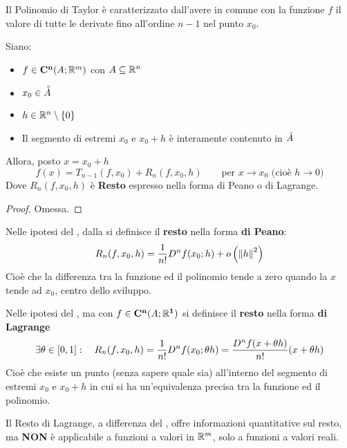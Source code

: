 \begin{observation}
	Il Polinomio di Taylor è caratterizzato dall’avere in comune con la funzione $f$ il valore di tutte le derivate fino all’ordine $n-1$ nel punto $x_0$.
\end{observation}
\begin{theorem}[di Taylor]
	\label{teo:taylor}
	Siano:
	\begin{itemize}[noitemsep]
		\item $f \in \mathbf{C^{n}}(A;\mathbb{R}^m)$ con $A \subseteq \mathbb{R}^n$
		\item $x_0 \in \accentset{\circ}{A}$
		\item $h \in \mathbb{R}^n \setminus \left\{0\right\}$
		\item Il segmento di estremi $x_0$ e $x_0 + h$ è interamente contenuto in $\accentset{\circ}{A}$
	\end{itemize}
	Allora, posto $x = x_0 + h$
	\[f(x) = T_{n-1}(f, x_0) + R_n(f, x_0, h) \qquad \text{per } x \to x_0 \text{ (cioè } h \to 0\text{)}\]
	Dove $R_n(f, x_0, h)$ è \textbf{Resto} espresso nella forma di Peano o di Lagrange.
	\begin{proof}
		Omessa.
	\end{proof}
\end{theorem}

\begin{definition}
	\label{def:resto_peano}
	Nelle ipotesi del , dalla  si definisce il \textbf{resto} nella forma \textbf{di Peano}:
	\[R_n(f, x_0, h) = \frac{1}{n!} D^nf(x_0; h) + o\left( \left\|h\right\|^2 \right)\]
	Cioè che la differenza tra la funzione ed il polinomio tende a zero quando la $x$ tende ad $x_0$, centro dello sviluppo.
\end{definition}

\begin{definition}
	Nelle ipotesi del , ma con $f \in \mathbf{C^{n}}(A;\mathbb{R}^{\boldsymbol{1}})$ si definisce il \textbf{resto} nella forma \textbf{di Lagrange}
	\[\exists \theta \in \left[0,1\right]: \quad R_n(f, x_0, h) = \frac{1}{n!} D^nf(x_0; \theta h) = \frac{D^n f(x + \theta h)}{n!} (x + \theta h)\]
	Cioè che esiste un punto (senza sapere quale sia) all'interno del segmento di estremi $x_0$ e $x_0 + h$ in cui si ha un'equivalenza precisa tra la funzione ed il polinomio.
\end{definition}
\begin{observation}
	\label{obs:resto_lagr_Rn}
	Il Resto di Lagrange, a differenza del , offre informazioni quantitative sul resto, ma \textbf{NON} è applicabile a funzioni a valori in $\mathbb{R}^m$, solo a funzioni a valori reali.
\end{observation}
\cbend

